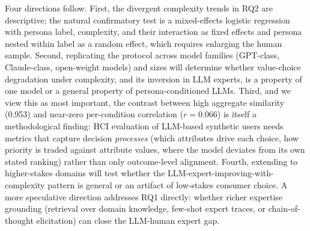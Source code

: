 \documentclass[manuscript,review]{acmart}
\begin{document}
Four directions follow. First, the divergent complexity trends in RQ2 are descriptive; the natural confirmatory test is a mixed-effects logistic regression with persona label, complexity, and their interaction as fixed effects and persona nested within label as a random effect, which requires enlarging the human sample. Second, replicating the protocol across model families (GPT-class, Claude-class, open-weight models) and sizes will determine whether value-choice degradation under complexity, and its inversion in LLM experts, is a property of one model or a general property of persona-conditioned LLMs. Third, and we view this as most important, the contrast between high aggregate similarity (0.953) and near-zero per-condition correlation ($r = 0.066$) is itself a methodological finding: HCI evaluation of LLM-based synthetic users needs metrics that capture decision \emph{processes} (which attributes drive each choice, how priority is traded against attribute values, where the model deviates from its own stated ranking) rather than only outcome-level alignment. Fourth, extending to higher-stakes domains will test whether the LLM-expert-improving-with-complexity pattern is general or an artifact of low-stakes consumer choice. A more speculative direction addresses RQ1 directly: whether richer expertise grounding (retrieval over domain knowledge, few-shot expert traces, or chain-of-thought elicitation) can close the LLM-human expert gap.
\end{document}
